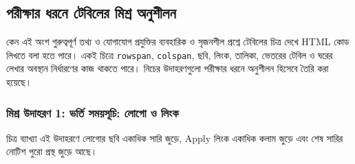 \subsection{পরীক্ষার ধরনে টেবিলের মিশ্র অনুশীলন}

\begin{boardbox}{কেন এই অংশ গুরুত্বপূর্ণ}
তথ্য ও যোগাযোগ প্রযুক্তির ব্যবহারিক ও সৃজনশীল প্রশ্নে টেবিলের চিত্র দেখে HTML কোড লিখতে বলা হতে পারে। একই চিত্রে \texttt{rowspan}, \texttt{colspan}, ছবি, লিংক, তালিকা, ভেতরের টেবিল ও ঘরের লেখার অবস্থান নির্ধারণের কাজ থাকতে পারে। নিচের উদাহরণগুলো পরীক্ষার ধরনে অনুশীলন হিসেবে তৈরি করা হয়েছে।
\end{boardbox}



\par\noindent\subsubsection{মিশ্র উদাহরণ 1: ভর্তি সময়সূচি: লোগো ও লিংক}
\noindent
\begin{keypointbox}{চিত্র ব্যাখ্যা}
এই উদাহরণে লোগোর ছবি একাধিক সারি জুড়ে, Apply লিংক একাধিক কলাম জুড়ে এবং শেষ সারির নোটিশ পুরো প্রস্থ জুড়ে আছে।
\end{keypointbox}


